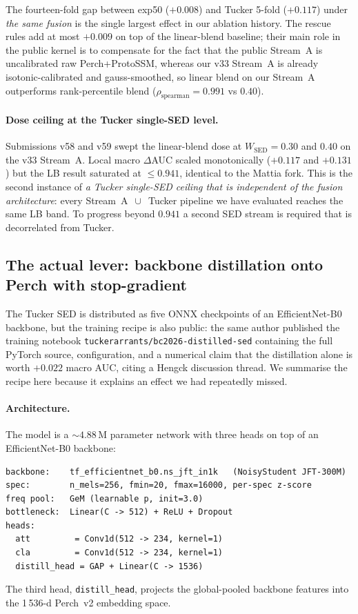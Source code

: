 The fourteen-fold gap between exp50 ($+0.008$) and Tucker 5-fold
($+0.117$) under \emph{the same fusion} is the single largest
effect in our ablation history. The rescue rules add at most
$+0.009$ on top of the linear-blend baseline; their main role in
the public kernel is to compensate for the fact that the public
Stream~A is uncalibrated raw Perch+ProtoSSM, whereas our v33
Stream~A is already isotonic-calibrated and gauss-smoothed, so
linear blend on our Stream~A outperforms rank-percentile blend
($\rho_\text{spearman} = 0.991$ vs $0.40$).

\paragraph{Dose ceiling at the Tucker single-SED level.}
Submissions v58 and v59 swept the linear-blend dose at
$W_\text{SED} = 0.30$ and $0.40$ on the v33 Stream~A. Local macro
$\Delta$AUC scaled monotonically ($+0.117$ and $+0.131$) but the
LB result saturated at $\le 0.941$, identical to the Mattia fork.
This is the second instance of \emph{a Tucker single-SED ceiling
that is independent of the fusion architecture}: every Stream~A
$\,\cup\,$ Tucker pipeline we have evaluated reaches the same LB
band. To progress beyond $0.941$ a second SED stream is required
that is decorrelated from Tucker.


\subsection{The actual lever: backbone distillation onto Perch with stop-gradient}
\label{sec:tucker-recipe}

The Tucker SED is distributed as five ONNX checkpoints of an
EfficientNet-B0 backbone, but the training recipe is also public:
the same author published the training notebook
\texttt{tuckerarrants/bc2026-distilled-sed} containing the full
PyTorch source, configuration, and a numerical claim that the
distillation alone is worth $+0.022$ macro AUC, citing a Hengck
discussion thread. We summarise the recipe here because it
explains an effect we had repeatedly missed.

\paragraph{Architecture.}
The model is a $\sim 4.88$\,M parameter network with three heads
on top of an EfficientNet-B0 backbone:
\begin{verbatim}
backbone:    tf_efficientnet_b0.ns_jft_in1k   (NoisyStudent JFT-300M)
spec:        n_mels=256, fmin=20, fmax=16000, per-spec z-score
freq pool:   GeM (learnable p, init=3.0)
bottleneck:  Linear(C -> 512) + ReLU + Dropout
heads:
  att         = Conv1d(512 -> 234, kernel=1)
  cla         = Conv1d(512 -> 234, kernel=1)
  distill_head = GAP + Linear(C -> 1536)
\end{verbatim}
The third head, \texttt{distill\_head}, projects the global-pooled
backbone features into the 1\,536-d Perch~v2 embedding space.


